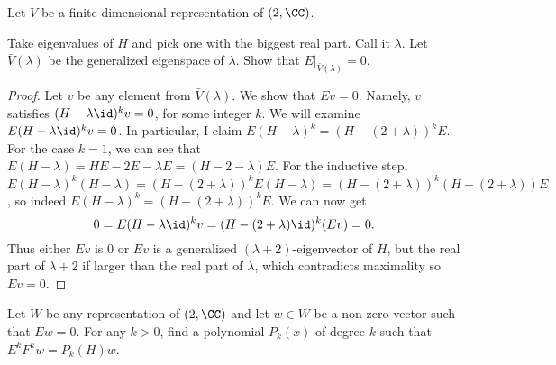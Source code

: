 \documentclass{article}
\begin{document}
Let $V$ be a finite dimensional representation of $\sl(2, \CC)$.

\begin{prb}
Take eigenvalues of $H$ and pick one with the biggest real part. Call it
$\lambda$. Let $\bar{V}(\lambda)$ be the generalized eigenspace of $\lambda$.
Show that $E|_{\bar{V}(\lambda)} = 0$.
\end{prb}

\begin{proof}
Let $v$ be any element from $\bar{V}(\lambda)$. We show that $Ev = 0$. Namely,
$v$ satisfies $(H - \lambda \id)^k v = 0$, for some integer $k$. We will examine
$E(H - \lambda \id)^k v = 0$. In particular, I claim $E(H - \lambda)^k = (H - (2
+ \lambda))^k E$. For the case $k = 1$, we can see that $E(H - \lambda) = HE -
2E - \lambda E = (H - 2 - \lambda) E$. For the inductive step, $E(H - \lambda)^k
(H - \lambda) = (H - (2 + \lambda))^k E (H - \lambda) = (H - (2 + \lambda))^k (H
- (2 + \lambda)) E$, so indeed $E(H - \lambda)^k = (H - (2 + \lambda))^k E$. We
can now get
\[ 0 = E(H - \lambda \id)^k v = (H - (2 + \lambda) \id)^k (Ev) = 0. \]
Thus either $Ev$ is $0$ or $Ev$ is a generalized $(\lambda + 2)$-eigenvector of
$H$, but the real part of $\lambda + 2$ if larger than the real part of
$\lambda$, which contradicts maximality so $Ev = 0$.
\end{proof}

\begin{prb}
Let $W$ be any representation of $\sl(2, \CC)$ and let $w \in W$ be a non-zero
vector such that $Ew = 0$. For any $k > 0$, find a polynomial $P_k(x)$ of degree
$k$ such that $E^k F^k w = P_k(H) w$.
\end{prb}
\end{document}
